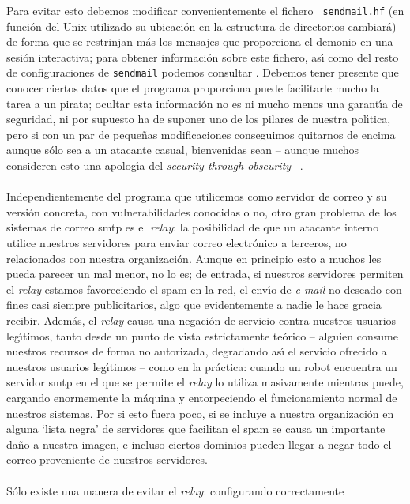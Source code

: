 Para evitar esto debemos modificar convenientemente el fichero {\tt 
sendmail.hf} (en funci\'on del Unix utilizado su ubicaci\'on en la estructura de
directorios cambiar\'a) de forma que se restrinjan m\'as los mensajes que
proporciona el demonio en una sesi\'on interactiva; para obtener informaci\'on
sobre este fichero, as\'{\i} como del resto de configuraciones de {\tt sendmail}
podemos consultar \cite{kn:cos97a}. Debemos tener presente que conocer ciertos
datos que el programa proporciona puede facilitarle mucho la tarea a un pirata;
ocultar esta informaci\'on no es ni mucho menos una garant\'{\i}a de seguridad,
ni por supuesto ha de suponer uno de los pilares de nuestra pol\'{\i}tica, pero 
si con un par de peque\~nas modificaciones conseguimos quitarnos de encima 
aunque s\'olo sea a un atacante casual, bienvenidas sean -- aunque muchos 
consideren esto una apolog\'{\i}a del {\it security through obscurity} --.\\
\\Independientemente del programa que utilicemos como servidor de correo y su 
versi\'on concreta, con vulnerabilidades conocidas o no, otro gran problema de 
los sistemas de correo {\sc smtp} es el {\it relay}: la posibilidad de que un
atacante interno utilice nuestros servidores para enviar correo electr\'onico a
terceros, no relacionados con nuestra organizaci\'on. Aunque en principio esto
a muchos les pueda parecer un mal menor, no lo es; de entrada, si nuestros 
servidores permiten el {\it relay} estamos favoreciendo el {\sc spam} en la red,
el env\'{\i}o de {\it e-mail} no deseado con fines casi siempre publicitarios,
algo que evidentemente a nadie le hace gracia recibir. Adem\'as, el {\it relay}
causa una negaci\'on de servicio contra nuestros usuarios leg\'{\i}timos, tanto
desde un punto de vista estrictamente te\'orico -- alguien consume nuestros
recursos de forma no autorizada, degradando as\'{\i} el servicio ofrecido a
nuestros usuarios leg\'{\i}timos -- como en la pr\'actica: cuando un robot
encuentra un servidor {\sc smtp} en el que se permite el {\it relay} lo utiliza
masivamente mientras puede, cargando enormemente la m\'aquina y entorpeciendo el
funcionamiento normal de nuestros sistemas. Por si esto fuera poco, si se
incluye a nuestra organizaci\'on en alguna `lista negra' de servidores que 
facilitan el {\sc spam} se causa un importante da\~no a nuestra imagen, e 
incluso ciertos dominios pueden llegar a negar todo el correo proveniente de
nuestros servidores.\\
\\S\'olo existe una manera de evitar el {\it relay}: configurando correctamente
